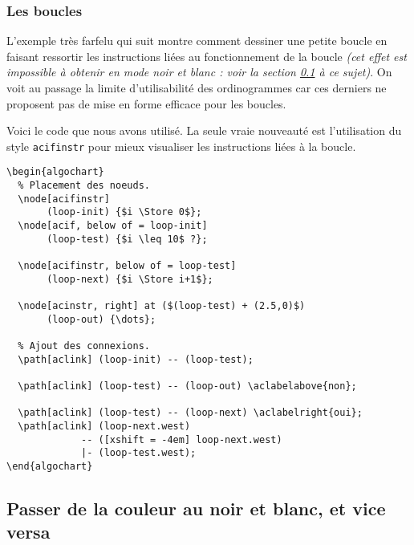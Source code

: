 \documentclass[12pt,a4paper]{article}
\theoremstyle{definition}
\newenvironment{frame-gene}[1][]{
	\begin{tcolorbox}[
		title        = #1, 
		colbacktitle = black!10!white, 
		colback      = white, 
		coltitle     = black,
		fonttitle    = \bfseries\itshape\small, 
		breakable,
		center title]
}{
	\end{tcolorbox}
}
\begin{document}
\subsubsection{Les boucles}

L'exemple très farfelu qui suit montre comment dessiner une petite boucle en faisant ressortir les instructions liées au fonctionnement de la boucle \emph{(cet effet est impossible à obtenir en mode noir et blanc : voir la section \ref{section:bw-mode} à ce sujet)}.
On voit au passage la limite d'utilisabilité des ordinogrammes car ces derniers ne proposent pas de mise en forme efficace pour les boucles.


\begin{center}
    \small
    
\end{center}


Voici le code que nous avons utilisé. La seule vraie nouveauté est l'utilisation du style \verb+acifinstr+ pour mieux visualiser les instructions liées à la boucle.

\medskip

\begin{frame-gene}
\begin{verbatim}
\begin{algochart}
  % Placement des noeuds.
  \node[acifinstr]
       (loop-init) {$i \Store 0$};
  \node[acif, below of = loop-init]
       (loop-test) {$i \leq 10$ ?};

  \node[acifinstr, below of = loop-test]
       (loop-next) {$i \Store i+1$};

  \node[acinstr, right] at ($(loop-test) + (2.5,0)$)
       (loop-out) {\dots};

  % Ajout des connexions.
  \path[aclink] (loop-init) -- (loop-test);

  \path[aclink] (loop-test) -- (loop-out) \aclabelabove{non};

  \path[aclink] (loop-test) -- (loop-next) \aclabelright{oui};
  \path[aclink] (loop-next.west)
             -- ([xshift = -4em] loop-next.west)
             |- (loop-test.west);
\end{algochart}
\end{verbatim}
\end{frame-gene}




\subsection{Passer de la couleur au noir et blanc, et vice versa} \label{section:bw-mode}
\end{document}
